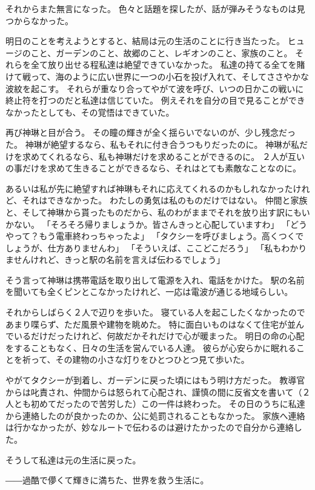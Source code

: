 \documentclass[uplatex,
  tate,
  book,
  onecolumn,
  paper=a6,
  oneside,
  openany,
  fontsize=9pt,
  jafontsize=9pt,
  number_of_lines=14,
  line_length=35zh,
  baselineskip=16pt,
  hanging_punctuation,
]{jlreq}
\begin{document}
それからまた無言になった。
色々と話題を探したが、話が弾みそうなものは見つからなかった。

明日のことを考えようとすると、結局は元の生活のことに行き当たった。
ヒュージのこと、ガーデンのこと、故郷のこと、レギオンのこと、家族のこと。
それらを全て放り出せる程私達は絶望できていなかった。
私達の持てる全てを賭けて戦って、海のように広い世界に一つの小石を投げ入れて、そしてささやかな波紋を起こす。
それらが重なり合ってやがて波を呼び、いつの日かこの戦いに終止符を打つのだと私達は信じていた。
例えそれを自分の目で見ることができなかったとしても、その覚悟はできていた。

再び神琳と目が合う。
その瞳の輝きが全く揺らいでないのが、少し残念だった。
神琳が絶望するなら、私もそれに付き合うつもりだったのに。
神琳が私だけを求めてくれるなら、私も神琳だけを求めることができるのに。
２人が互いの事だけを求めて生きることができるなら、それはとても素敵なことなのに。

あるいは私が先に絶望すれば神琳もそれに応えてくれるのかもしれなかったけれど、それはできなかった。
わたしの勇気は私のものだけではない。
仲間と家族と、そして神琳から貰ったものだから、私のわがままでそれを放り出す訳にもいかない。
\newline
「そろそろ帰りましょうか。皆さんきっと心配していますわ」
\newline
「どうやって？もう電車終わっちゃったよ」
\newline
「タクシーを呼びましょう。高くつくでしょうが、仕方ありませんわ」
\newline
「そういえば、ここどこだろう」
\newline
「私もわかりませんけれど、きっと駅の名前を言えば伝わるでしょう」

そう言って神琳は携帯電話を取り出して電源を入れ、電話をかけた。
駅の名前を聞いても全くピンとこなかったけれど、一応は電波が通じる地域らしい。
\newline

それからしばらく２人で辺りを歩いた。
寝ている人を起こしたくなかったのであまり喋らず、ただ風景や建物を眺めた。
特に面白いものはなくて住宅が並んでいるだけだったけれど、何故だかそれだけで心が暖まった。
明日の命の心配をすることもなく、日々の生活を営んでいる人達。
彼らが心安らかに眠れることを祈って、その建物の小さな灯りをひとつひとつ見て歩いた。

やがてタクシーが到着し、ガーデンに戻った頃にはもう明け方だった。
教導官からは叱責され、仲間からは怒られて心配され、謹慎の間に反省文を書いて（２人とも初めてだったので苦労した）この一件は終わった。
その日のうちに私達から連絡したのが良かったのか、公に処罰されることもなかった。
家族へ連絡は行かなかったが、妙なルートで伝わるのは避けたかったので自分から連絡した。

そうして私達は元の生活に戻った。

――過酷で儚くて輝きに満ちた、世界を救う生活に。
\end{document}
